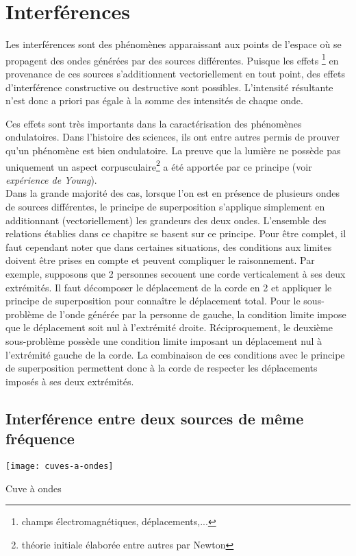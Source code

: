 \chapter{Interférences}
Les interférences sont des phénomènes apparaissant aux points de l'espace où se propagent des ondes générées par des sources différentes. Puisque les effets \footnote{champs électromagnétiques, déplacements,...} en provenance de ces sources s'additionnent vectoriellement en tout point, des effets d'interférence constructive ou destructive sont possibles. L'intensité résultante n'est donc a priori pas égale à la somme des intensités de chaque onde. 

Ces effets sont très importants dans la caractérisation des phénomènes ondulatoires. Dans l'histoire des sciences, ils ont entre autres permis de prouver qu'un phénomène est bien ondulatoire. La preuve que la lumière ne possède pas uniquement un aspect corpusculaire\footnote{théorie initiale élaborée entre autres par Newton} a été apportée par ce principe (voir \textit{expérience de Young}).\\

Dans la grande majorité des cas, lorsque l'on est en présence de plusieurs ondes de sources différentes, le principe de superposition s'applique simplement en additionnant (vectoriellement) les grandeurs des deux ondes. L'ensemble des relations établies dans ce chapitre se basent sur ce principe. Pour être complet, il faut cependant noter que dans certaines situations, des conditions aux limites doivent être prises en compte et peuvent compliquer le raisonnement. Par exemple, supposons que 2 personnes secouent une corde verticalement à ses deux extrémités. Il faut décomposer le déplacement de la corde en 2 et appliquer le principe de superposition pour connaître le déplacement total. Pour le sous-problème de l'onde générée par la personne de gauche, la condition limite impose que le déplacement soit nul à l'extrémité droite. Réciproquement, le deuxième sous-problème possède une condition limite imposant un déplacement nul à l'extrémité gauche de la corde. La combinaison de ces conditions avec le principe de superposition permettent donc à la corde de respecter les déplacements imposés à ses deux extrémités.

\section{Interférence entre deux sources de même fréquence}

\begin{marginfigure}[0cm]
	\texttt{[image: cuves-a-ondes]}
	\caption{Cuve à ondes}
\end{marginfigure}

